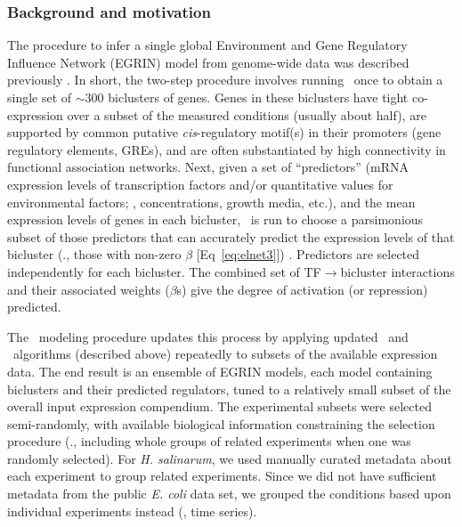 \subsubsection{Background and motivation}

The procedure to infer a single global Environment and Gene Regulatory
Influence Network (EGRIN) model from genome-wide data was described
previously \cite{Bonneau2007,Bonneau2006,Reiss2006n}. In short, the
two-step procedure involves running \cm~once to obtain a single set of
$\sim 300$ biclusters of genes. Genes in these biclusters have tight
co-expression over a subset of the measured conditions (usually about
half), are supported by common putative
\textit{cis}-regulatory motif(s) in their promoters (gene regulatory elements, GREs), 
and are often substantiated by high connectivity in functional
association networks. Next, given a set of ``predictors'' (mRNA
expression levels of transcription factors and/or quantitative values
for environmental factors; \eg, concentrations, growth media, etc.),
and the mean expression levels of genes in each bicluster, \nwinf~is
run to choose a parsimonious subset of those predictors that can
accurately predict the expression levels of that bicluster (\ie.,
those with non-zero $\beta$ [Eq~\ref{eq:elnet3}]) . Predictors are
selected independently for each bicluster. The combined set of
TF$\rightarrow$bicluster interactions and their associated weights
($\beta$s) give the degree of activation (or repression) predicted.

The \egrine~modeling procedure updates this process by applying 
updated \cm\ and \nwinf\ algorithms (described above)
repeatedly to subsets of the available expression data. The end result
is an ensemble of EGRIN models, each model containing biclusters and
their predicted regulators, tuned to a relatively small subset of the
overall input expression compendium. The experimental subsets were
selected semi-randomly, with available biological information
constraining the selection procedure (\ie., including whole groups of
related experiments when one was randomly selected). For {\it
H. salinarum}, we used manually curated metadata about each experiment
to group related experiments. Since we did not have sufficient metadata 
from the public \textit{E. coli} data set,
 we grouped the conditions based upon individual experiments instead (\eg,
time series). 

